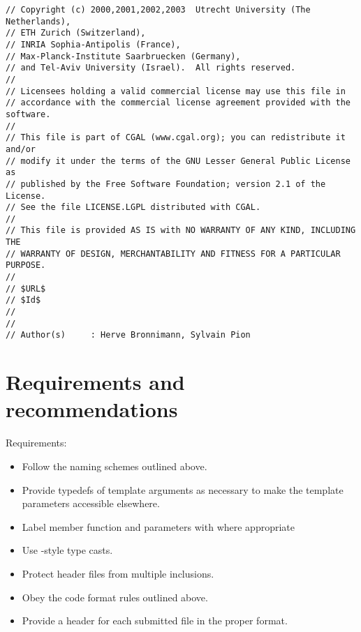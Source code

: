 \begin{verbatim}
// Copyright (c) 2000,2001,2002,2003  Utrecht University (The Netherlands),
// ETH Zurich (Switzerland),
// INRIA Sophia-Antipolis (France),
// Max-Planck-Institute Saarbruecken (Germany),
// and Tel-Aviv University (Israel).  All rights reserved.
//
// Licensees holding a valid commercial license may use this file in
// accordance with the commercial license agreement provided with the software.
//
// This file is part of CGAL (www.cgal.org); you can redistribute it and/or
// modify it under the terms of the GNU Lesser General Public License as
// published by the Free Software Foundation; version 2.1 of the License.
// See the file LICENSE.LGPL distributed with CGAL.
//
// This file is provided AS IS with NO WARRANTY OF ANY KIND, INCLUDING THE
// WARRANTY OF DESIGN, MERCHANTABILITY AND FITNESS FOR A PARTICULAR PURPOSE.
//
// $URL$
// $Id$
// 
//
// Author(s)     : Herve Bronnimann, Sylvain Pion
\end{verbatim}


\section{Requirements and recommendations\label{sec:code_format_doc_req_and_rec}}

\noindent
Requirements:
\begin{itemize}
   \item Follow the naming schemes outlined above.
   \item Provide typedefs of template arguments as necessary to make the
         template parameters accessible elsewhere.
   \item Label member function and parameters with  where 
         appropriate
   \item Use \CC-style type casts.
   \item Protect header files from multiple inclusions.
   \item Obey the code format rules outlined above.
   \item Provide a header for each submitted file in the proper format.
\end{itemize}


